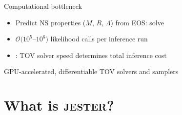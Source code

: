 \documentclass[usenames,dvipsnames,t]{beamer}
\begin{document}
\begin{frame}{Computational bottleneck}
  \def\x{4mm}
  \def\y{2mm}

  \begin{itemize}
    \item Predict NS properties ($M$, $R$, $\Lambda$) from EOS: solve 

    \vspace{\x}

    \item $\mathcal{O}(10^5$--$10^6)$ likelihood calls per inference run

    \vspace{\x}

    \item {}: TOV solver speed determines total inference cost
  \end{itemize}

  \pause
  \vspace{\x}

  \begin{tcolorbox}[colback=blue!5!white,colframe=blue!75!black,title=Solution]
    GPU-accelerated, differentiable TOV solvers and samplers
  \end{tcolorbox}

\end{frame}

\section{What is \textsc{jester}?}
\end{document}
